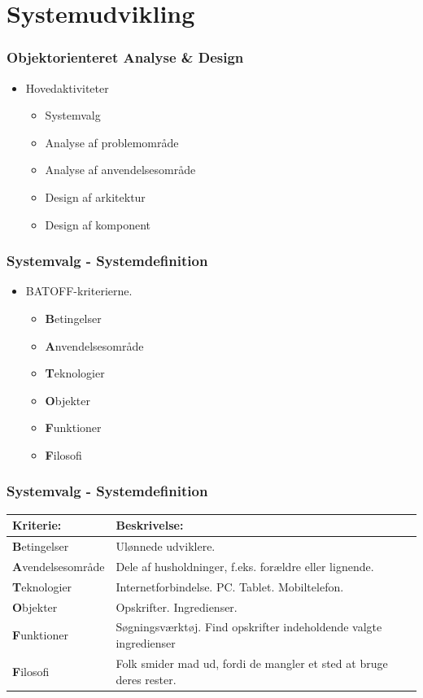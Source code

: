 \section{Systemudvikling}
	\begin{frame}
		\frametitle{Objektorienteret Analyse \& Design}
		\begin{itemize}
			\item Hovedaktiviteter
			\begin{itemize}
				\item Systemvalg
				\item Analyse af problemområde
				\item Analyse af anvendelsesområde
				\item Design af arkitektur
				\item Design af komponent
			\end{itemize}
		\end{itemize}
	\end{frame}
	
	\begin{frame}
		\frametitle{Systemvalg - Systemdefinition}
		\begin{itemize}
			\item  BATOFF-kriterierne.
				\begin{itemize}
				\item  \textbf{B}etingelser
				\item  \textbf{A}nvendelsesområde
				\item  \textbf{T}eknologier
				\item  \textbf{O}bjekter
				\item  \textbf{F}unktioner
				\item  \textbf{F}ilosofi
				\end{itemize}
		\end{itemize}
	\end{frame}
		
	\begin{frame}
		\frametitle{Systemvalg - Systemdefinition}
		\begin{center}
    		\begin{tabular}{ | l | p{5cm} |} \hline
   				\textbf{Kriterie:} & \bf{Beskrivelse:} \\ \hline
    			\textbf{B}etingelser & Ulønnede udviklere. \\ \hline
    			\textbf{A}vendelsesområde & Dele af husholdninger, f.eks. forældre eller lignende. \\ \hline
    			\textbf{T}eknologier & Internetforbindelse. PC. Tablet. Mobiltelefon. \\ \hline
    			\textbf{O}bjekter & Opskrifter. Ingredienser. \\ \hline
    			\textbf{F}unktioner & Søgningsværktøj. Find opskrifter indeholdende valgte ingredienser \\ \hline
    			\textbf{F}ilosofi & Folk smider mad ud, fordi de mangler et sted at bruge deres rester. \\ \hline
    		\end{tabular}
		\end{center}
	\end{frame}
	
